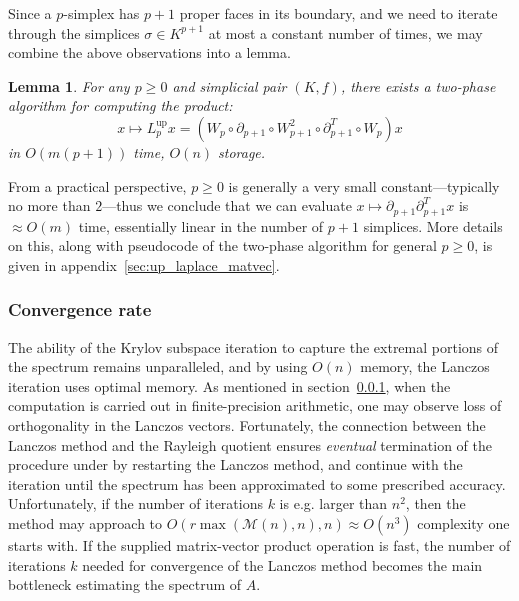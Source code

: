 \documentclass[10pt]{article}
\numberwithin{equation}{section}
\newcommand{\+}{%
	\raisebox{0.18ex}{\scaleobj{0.55}{+}}
}
\newtheorem{lemma}{Lemma}
\theoremstyle{definition}
\begin{document}
Since a $p$-simplex has $p+1$ proper faces in its boundary, and we need to iterate through the simplices $\sigma \in K^{p+1}$ at most a constant number of times, we may combine the above observations into a lemma. 
\begin{lemma}
	For any $p \geq 0$ and simplicial pair $(K, f)$, there exists a two-phase algorithm for computing the product: 
	\begin{equation}
		x \mapsto L_p^{\text{up}} x = (W_p \circ \partial_{p+1} \circ W_{p+1}^2 \circ \partial_{p+1}^T \circ W_p)x
	\end{equation}
	in $O(m(p+1))$ time, $O(n)$ storage. 
\end{lemma}
\noindent From a practical perspective, $p \geq 0$ is generally a very small constant---typically no more than $2$---thus we conclude that we can evaluate $x \mapsto \partial_{p+1} \partial_{p+1}^T x$ is $\approx O(m)$ time, essentially linear in the number of $p+1$ simplices. 
More details on this, along with pseudocode of the two-phase algorithm for general $p \geq 0$, is given in appendix~\ref{sec:up_laplace_matvec}.


  
\subsubsection{Convergence rate}
The ability of the Krylov subspace iteration to capture the extremal portions of the spectrum remains unparalleled, and by using $O(n)$ memory, the Lanczos iteration uses optimal memory. 
As mentioned in section~\ref{}, when the computation is carried out in finite-precision arithmetic, one may observe loss of orthogonality in the Lanczos vectors. 
Fortunately, the connection between the Lanczos method and the Rayleigh quotient ensures \emph{eventual} termination of the procedure under by restarting the Lanczos method, and continue with the iteration until the spectrum has been approximated to some prescribed accuracy. 
Unfortunately, if the number of iterations $k$ is e.g. larger than $n^2$, then the method may approach to $O(r\max(\mathcal{M}(n), n), n) \approx O(n^3)$ complexity one starts with. 
If the supplied matrix-vector product operation is fast, the number of iterations $k$ needed for convergence of the Lanczos method becomes the main bottleneck estimating the spectrum of $A$.
\end{document}
